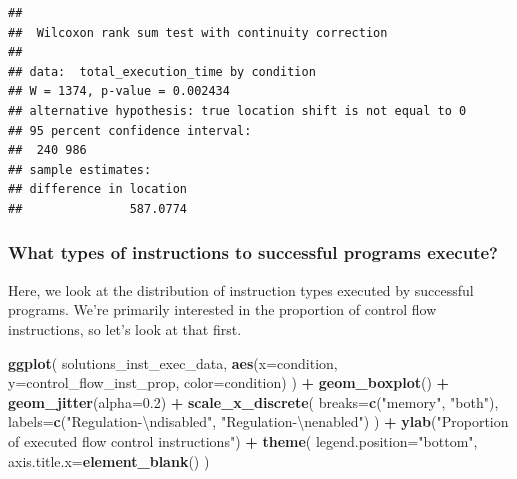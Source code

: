 \documentclass[
]{book}
\newenvironment{Shaded}{\begin{snugshade}}{\end{snugshade}}
\newcommand{\CharTok}[1]{\textcolor[rgb]{0.31,0.60,0.02}{#1}}
\newcommand{\DataTypeTok}[1]{\textcolor[rgb]{0.13,0.29,0.53}{#1}}
\newcommand{\FloatTok}[1]{\textcolor[rgb]{0.00,0.00,0.81}{#1}}
\newcommand{\KeywordTok}[1]{\textcolor[rgb]{0.13,0.29,0.53}{\textbf{#1}}}
\newcommand{\NormalTok}[1]{#1}
\newcommand{\OperatorTok}[1]{\textcolor[rgb]{0.81,0.36,0.00}{\textbf{#1}}}
\newcommand{\StringTok}[1]{\textcolor[rgb]{0.31,0.60,0.02}{#1}}
\begin{document}
\begin{verbatim}
## 
##  Wilcoxon rank sum test with continuity correction
## 
## data:  total_execution_time by condition
## W = 1374, p-value = 0.002434
## alternative hypothesis: true location shift is not equal to 0
## 95 percent confidence interval:
##  240 986
## sample estimates:
## difference in location 
##               587.0774
\end{verbatim}

\hypertarget{what-types-of-instructions-to-successful-programs-execute-1}{%
\subsubsection{What types of instructions to successful programs execute?}\label{what-types-of-instructions-to-successful-programs-execute-1}}

Here, we look at the distribution of instruction types executed by successful programs.
We're primarily interested in the proportion of control flow instructions, so let's look at that first.

\begin{Shaded}
\begin{Highlighting}[]
\KeywordTok{ggplot}\NormalTok{( solutions\_inst\_exec\_data, }\KeywordTok{aes}\NormalTok{(}\DataTypeTok{x=}\NormalTok{condition, }\DataTypeTok{y=}\NormalTok{control\_flow\_inst\_prop, }\DataTypeTok{color=}\NormalTok{condition) ) }\OperatorTok{+}
\StringTok{  }\KeywordTok{geom\_boxplot}\NormalTok{() }\OperatorTok{+}
\StringTok{  }\KeywordTok{geom\_jitter}\NormalTok{(}\DataTypeTok{alpha=}\FloatTok{0.2}\NormalTok{) }\OperatorTok{+}
\StringTok{  }\KeywordTok{scale\_x\_discrete}\NormalTok{(}
    \DataTypeTok{breaks=}\KeywordTok{c}\NormalTok{(}\StringTok{"memory"}\NormalTok{, }\StringTok{"both"}\NormalTok{),}
    \DataTypeTok{labels=}\KeywordTok{c}\NormalTok{(}\StringTok{"Regulation{-}}\CharTok{\textbackslash{}n}\StringTok{disabled"}\NormalTok{, }\StringTok{"Regulation{-}}\CharTok{\textbackslash{}n}\StringTok{enabled"}\NormalTok{)}
\NormalTok{  ) }\OperatorTok{+}
\StringTok{  }\KeywordTok{ylab}\NormalTok{(}\StringTok{"Proportion of executed flow control instructions"}\NormalTok{) }\OperatorTok{+}
\StringTok{  }\KeywordTok{theme}\NormalTok{(}
    \DataTypeTok{legend.position=}\StringTok{"bottom"}\NormalTok{,}
    \DataTypeTok{axis.title.x=}\KeywordTok{element\_blank}\NormalTok{()}
\NormalTok{  )}
\end{Highlighting}
\end{Shaded}
\end{document}
